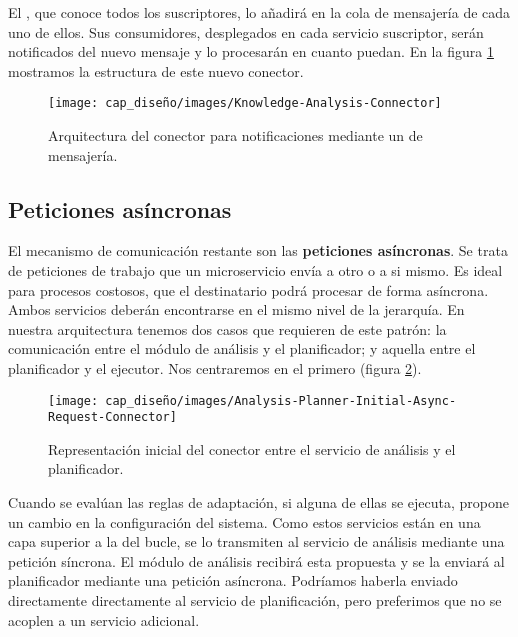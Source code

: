 El , que conoce todos los suscriptores, lo añadirá en la cola de mensajería de cada uno de ellos. Sus consumidores, desplegados en cada servicio suscriptor, serán notificados del nuevo mensaje y lo procesarán en cuanto puedan. En la figura \ref{fig:knowledge-analyisis-connector-architecture} mostramos la estructura de este nuevo conector.

\begin{figure}[h!]
  \centering
  \texttt{[image: cap\_diseño/images/Knowledge-Analysis-Connector]}
  \caption{Arquitectura del conector para notificaciones mediante un  de mensajería.}
  \label{fig:knowledge-analyisis-connector-architecture}
\end{figure}

\subsection{Peticiones asíncronas}

El mecanismo de comunicación restante son las \textbf{peticiones asíncronas}. Se trata de peticiones de trabajo que un microservicio envía a otro o a si mismo. Es ideal para procesos costosos, que el destinatario podrá procesar de forma asíncrona. Ambos servicios deberán encontrarse en el mismo nivel de la jerarquía. En nuestra arquitectura tenemos dos casos que requieren de este patrón: la comunicación entre el módulo de análisis y el planificador; y aquella entre el planificador y el ejecutor. Nos centraremos en el primero (figura \ref{fig:analyisis-planner-async-request-initial-connector}).

\begin{figure}[H]
  \centering
  \texttt{[image: cap\_diseño/images/Analysis-Planner-Initial-Async-Request-Connector]}
  \caption{Representación inicial del conector entre el servicio de análisis y el planificador.}
  \label{fig:analyisis-planner-async-request-initial-connector}
\end{figure}

Cuando se evalúan las reglas de adaptación, si alguna de ellas se ejecuta, propone un cambio en la configuración del sistema. Como estos servicios están en una capa superior a la del bucle, se lo transmiten al servicio de análisis mediante una petición síncrona. El módulo de análisis recibirá esta propuesta y se la enviará al planificador mediante una petición asíncrona. Podríamos haberla enviado directamente directamente al servicio de planificación, pero preferimos que no se acoplen a un servicio adicional.

